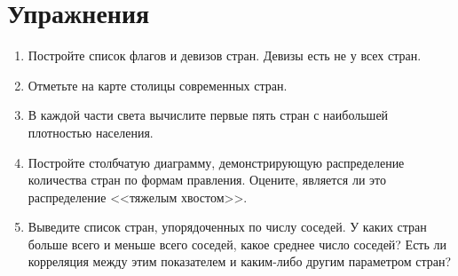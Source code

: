 \section{Упражнения}

\begin{enumerate}
	\item Постройте список флагов и девизов стран. Девизы есть не у всех стран.
	\item Отметьте на карте столицы современных стран.
	\item В каждой части света вычислите первые пять стран с наибольшей плотностью населения.
	\item Постройте столбчатую диаграмму, демонстрирующую распределение количества стран по формам правления. Оцените, является ли это распределение <<тяжелым хвостом>>\protect\footnotemark.
	\item Выведите список стран, упорядоченных по числу соседей. У каких стран больше всего и меньше всего соседей, какое среднее число соседей? Есть ли корреляция между этим показателем и каким-либо другим параметром стран?
\end{enumerate}


